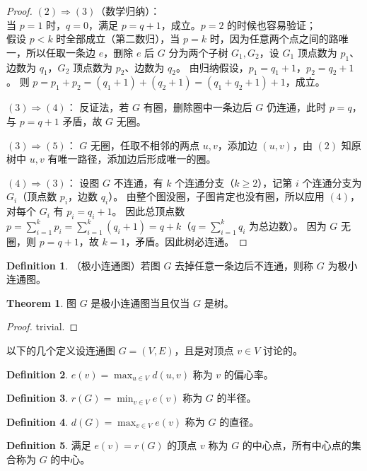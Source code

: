 \documentclass[oneside]{book}
\theoremstyle{definition}
\newtheorem{definition}{Definition}[section]
\newtheorem{theorem}{Theorem}[section]
\begin{document}
\begin{proof}
	\( (2) \Rightarrow (3) \)（数学归纳）：\\
	当 \( p=1 \) 时，\( q=0 \)，满足 \( p = q + 1 \)，成立。\(p=2\) 的时候也容易验证；\\
	假设 \( p<k \) 时全部成立（第二数归），当 \( p=k \) 时，因为任意两个点之间的路唯一，所以任取一条边 \( e \)，删除 \( e \) 后 \( G \) 分为两个子树 \( G_1, G_2 \)，设 \( G_1 \) 顶点数为 \( p_1 \)、边数为 \( q_1 \)，\( G_2 \) 顶点数为 \( p_2 \)、边数为 \( q_2 \)。
	由归纳假设，\( p_1 = q_1 + 1 \)，\( p_2 = q_2 + 1 \)。
	则 \( p = p_1 + p_2 = (q_1 + 1) + (q_2 + 1) = (q_1 + q_2+1) + 1 \)，成立。
	
	\( (3) \Rightarrow (4) \)：
	反证法，若 \( G \) 有圈，删除圈中一条边后 \( G \) 仍连通，此时 \( p = q \)，与 \( p = q + 1 \) 矛盾，故 \( G \) 无圈。
	
	\( (3) \Rightarrow (5) \)：
	\( G \) 无圈，任取不相邻的两点 \( u, v \)，添加边 \( (u, v) \)，由 \( (2) \) 知原树中 \( u, v \) 有唯一路径，添加边后形成唯一的圈。


	\( (4) \Rightarrow (3) \)：
	设图 \( G \) 不连通，有 \( k \) 个连通分支（\( k \geq 2 \)），记第 \( i \) 个连通分支为 \( G_i \)（顶点数 \( p_i \)，边数 \( q_i \)）。
	由整个图没圈，子图肯定也没有圈，所以应用 \((4)\)， 对每个 \( G_i \) 有 \( p_i = q_i + 1 \)。
	因此总顶点数 \( p = \sum_{i=1}^k p_i = \sum_{i=1}^k (q_i + 1) = q + k \)（\( q = \sum_{i=1}^k q_i \) 为总边数）。
	因为 \( G \) 无圈，则 \( p = q + 1 \)，故 \( k = 1 \)，矛盾。因此树必连通。
\end{proof}

\begin{definition}
	（极小连通图）若图 \( G \) 去掉任意一条边后不连通，则称 \( G \) 为极小连通图。
\end{definition}

\begin{theorem}
	图 \( G \) 是极小连通图当且仅当 \( G \) 是树。
\end{theorem}

\begin{proof}
	trivial.
\end{proof}
以下的几个定义设连通图 \( G = (V, E) \)，且是对顶点 \( v \in V \) 讨论的。
\begin{definition}
	\( e(v) = \max_{u \in V} d(u, v) \) 称为 \( v \) 的偏心率。
\end{definition}
\begin{definition}
	\( r(G) = \min_{v \in V} e(v) \) 称为 \( G \) 的半径。
\end{definition}
\begin{definition}
	\( d(G) = \max_{v \in V} e(v) \) 称为 \( G \) 的直径。
\end{definition}
\begin{definition}
	满足 \( e(v) = r(G) \) 的顶点 \( v \) 称为 \( G \) 的中心点，所有中心点的集合称为 \( G \) 的中心。
\end{definition}
\end{document}
